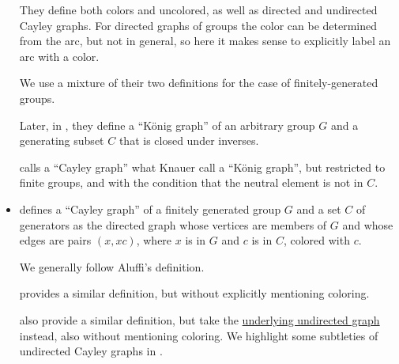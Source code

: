 \begin{remark}
\begin{itemize}
    They define both colors and uncolored, as well as directed and undirected Cayley graphs. For directed graphs of groups the color can be determined from the arc, but not in general, so here it makes sense to explicitly label an arc with a color.

    We use a mixture of their two definitions for the case of finitely-generated groups.

    Later, in \cite[def. 7.3.2]{Knauer2019AlgebraicGraphTheory}, they define a \enquote{K\"onig graph} of an arbitrary group \( G \) and a generating subset \( C \) that is closed under inverses.

     calls a \enquote{Cayley graph} what Knauer call a \enquote{K\"onig graph}, but restricted to finite groups, and with the condition that the neutral element is not in \( C \).

    \item {} defines a \enquote{Cayley graph} of a finitely generated group \( G \) and a set \( C \) of generators as the directed graph whose vertices are members of \( G \) and whose edges are pairs \( (x, xc) \), where \( x \) is in \( G \) and \( c \) is in \( C \), colored with \( c \).

    We generally follow Aluffi's definition.

     provides a similar definition, but without explicitly mentioning coloring.

     also provide a similar definition, but take the \hyperref[def:graph_functors/simple_forgetful]{underlying undirected graph} instead, also without mentioning coloring. We highlight some subtleties of undirected Cayley graphs in .
  \end{itemize}
\end{remark}

